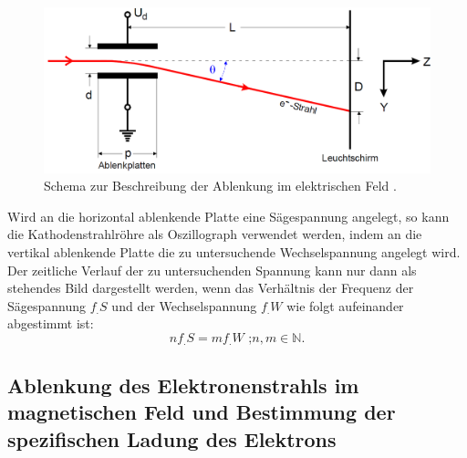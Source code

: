 \begin{figure}
\centering
\includegraphics[width=\linewidth-50pt,height=\textheight-50pt,keepaspectratio]{content/images/Ablenkung-Im-E-Feld.jpg}
\caption{Schema zur Beschreibung der Ablenkung im elektrischen Feld \cite{V501}.}
\label{fig:E-Feld}
\end{figure}

\noindent Wird an die horizontal ablenkende Platte eine Sägespannung angelegt, so kann die Kathodenstrahlröhre als Oszillograph verwendet werden, indem an die vertikal ablenkende Platte die zu untersuchende Wechselspannung angelegt wird.
Der zeitliche Verlauf der zu untersuchenden Spannung kann nur dann als stehendes Bild dargestellt werden, wenn das Verhältnis der Frequenz der Sägespannung $f_.S$ und der Wechselspannung $f_.W$ wie folgt aufeinander abgestimmt ist:
\begin{equation}
nf_.S=mf_.W\text{ ;}n,m\in \mathbb{N}\text{.}\label{frequenzabhängigkeit}
\end{equation}

\subsection{Ablenkung des Elektronenstrahls im magnetischen Feld und Bestimmung der spezifischen Ladung des Elektrons}


